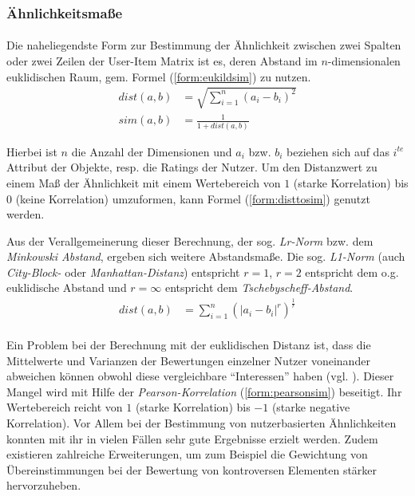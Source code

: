 \subsubsection{Ähnlichkeitsmaße}
\label{sec:similarities}

\paragraph{} Die naheliegendste Form zur Bestimmung der Ähnlichkeit zwischen zwei Spalten oder zwei Zeilen der User-Item Matrix ist es, deren Abstand im $n$-dimensionalen euklidischen Raum, gem. Formel (\ref{form:eukildsim}) zu nutzen.
\begin{align}
\label{form:eukildsim}
dist(a,b) & = \sqrt{\sum_{i=1}^{n} (a_i - b_i)^2} \\
sim(a,b) & = \frac{1}{1+dist(a,b)} \label{form:disttosim}
\end{align}

Hierbei ist $n$ die Anzahl der Dimensionen und $a_i$ bzw. $b_i$ beziehen sich auf das  $i^{te}$ Attribut der Objekte, resp. die Ratings der Nutzer. Um den Distanzwert zu einem Maß der Ähnlichkeit mit einem Wertebereich von $1$ (starke Korrelation) bis $0$ (keine Korrelation) umzuformen, kann Formel (\ref{form:disttosim}) genutzt werden.

Aus der Verallgemeinerung dieser Berechnung, der sog. \textit{Lr-Norm} bzw. dem \textit{Minkowski Abstand}, ergeben sich weitere Abstandsmaße. Die sog. \textit{L1-Norm} (auch \textit{City-Block-} oder \textit{Manhattan-Distanz}) entspricht $r=1$, $r=2$ entspricht dem o.g. euklidische Abstand und $ r=\infty $ entspricht dem \textit{Tschebyscheff-Abstand}. \citep{hb_02}
\begin{align}
\label{form:minkowskisim}
dist(a,b) & = \sum_{i=1}^{n} (\left| a_i - b_i \right|^r)^\frac{1}{r}
\end{align}

\paragraph{} Ein Problem bei der Berechnung mit der euklidischen Distanz ist, dass die Mittelwerte und Varianzen der Bewertungen einzelner Nutzer voneinander abweichen können obwohl diese vergleichbare ``Interessen'' haben (vgl. \citep[Kap. 2]{pci}). Dieser Mangel wird mit Hilfe der \textit{Pearson-Korrelation} (\ref{form:pearsonsim}) beseitigt.  Ihr Wertebereich reicht von $1$ (starke Korrelation) bis $-1$ (starke negative Korrelation). Vor Allem bei der Bestimmung von nutzerbasierten Ähnlichkeiten konnten mit ihr in vielen Fällen sehr gute Ergebnisse erzielt werden. Zudem existieren zahlreiche Erweiterungen, um zum Beispiel die Gewichtung von Übereinstimmungen bei der Bewertung von kontroversen Elementen stärker hervorzuheben. \citep[Kap. 2.1]{rs} \citep{hb_02}

